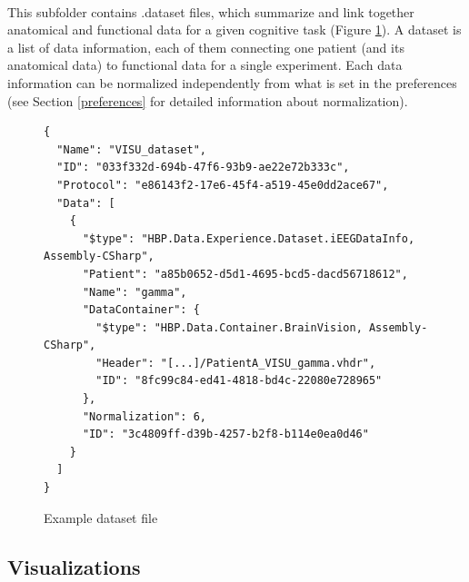 \documentclass[a4paper]{article}
\begin{document}
\paragraph{} This subfolder contains .dataset files, which summarize and link together anatomical and functional data for a given cognitive task (Figure \ref{datasetFile}).
A dataset is a list of data information, each of them connecting one patient (and its anatomical data) to functional data for a single experiment. Each data information can be normalized independently from what is set in the preferences (see Section \ref{preferences} for detailed information about normalization).
\begin{figure}[H]
\begin{lstlisting}
{
  "Name": "VISU_dataset",
  "ID": "033f332d-694b-47f6-93b9-ae22e72b333c",
  "Protocol": "e86143f2-17e6-45f4-a519-45e0dd2ace67",
  "Data": [
    {
      "$type": "HBP.Data.Experience.Dataset.iEEGDataInfo, Assembly-CSharp",
      "Patient": "a85b0652-d5d1-4695-bcd5-dacd56718612",
      "Name": "gamma",
      "DataContainer": {
        "$type": "HBP.Data.Container.BrainVision, Assembly-CSharp",
        "Header": "[...]/PatientA_VISU_gamma.vhdr",
        "ID": "8fc99c84-ed41-4818-bd4c-22080e728965"
      },
      "Normalization": 6,
      "ID": "3c4809ff-d39b-4257-b2f8-b114e0ea0d46"
    }
  ]
}
\end{lstlisting}
\caption{\label{datasetFile}Example dataset file}
\end{figure}
\subsection{Visualizations}
\end{document}
